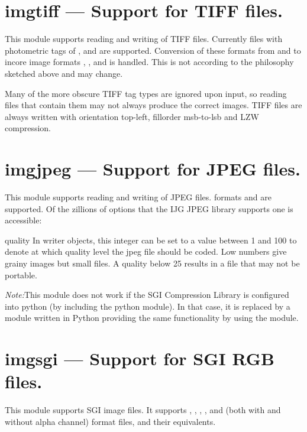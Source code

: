 \section{imgtiff ---
	Support for TIFF files.}

This module supports reading and writing of TIFF files. Currently
files with photometric tags of , 
and  are supported. Conversion of these formats from and to
incore image formats , ,  and
 is handled. This is not according to the philosophy
sketched above and may change.

Many of the more obscure TIFF tag types are ignored upon input, so
reading files that contain them may not always produce the correct
images. TIFF files are always written with orientation top-left,
fillorder msb-to-lsb and LZW compression.

\section{imgjpeg ---
	Support for JPEG files.}
This module supports reading and writing of JPEG files. formats
 and  are supported. Of the zillions of options
that the IJG JPEG library supports one is accessible:

\begin{memberdesc}[imgjpegwriter]{quality}
In writer objects, this integer can be set to a value between 1 and
100 to denote at which quality level the jpeg file should be
coded. Low numbers give grainy images but small files. A quality below
25 results in a file that may not be portable.
\end{memberdesc}

{\em Note:}This module does not work if the SGI Compression Library is
configured into python (by including the python  module). In
that case, it is replaced by a module written in Python providing the
same functionality by using the  module.

\section{imgsgi ---
	Support for SGI RGB files.}

This module supports SGI image files. It supports , ,
, , and  (both with and without alpha channel)
format files, and their  equivalents.

